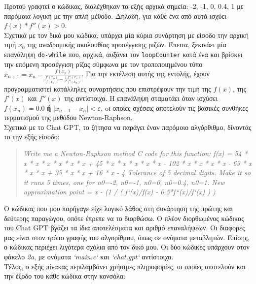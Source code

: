 \documentclass[a4paper, 14pt]{article}   %
\begin{document}
Προτού γραφτεί ο κώδικας, διαλέχθηκαν τα εξής αρχικά σημεία: -2, -1, 0, 0.4, 1 με παρόμοια λογική με την απλή μέθοδο. Δηλαδή, για κάθε ένα από αυτά ισχύει \(f(x)*f''(x)>0\).\\

Σχετικά με τον δικό μου κώδικα, υπάρχει μία κύρια συνάρτηση με είσοδο την αρχική τιμή \(x_0\) της αναδρομικής ακολουθίας προσέγγισης ριζών. Έπειτα, ξεκινάει μία επανάληψη \texttt{do-while} που, αρχικά, αυξάνει τον \texttt{loopCounter} κατά ένα και βρίσκει την επόμενη προσέγγιση ρίζας σύμφωνα με τον τροποποιημένου τύπο \(x_{n+1} = x_n - \frac{f(x_n)}{\frac{f'(x_n)}{f(x_n)} - \frac{1}{2} \frac{f''(x_n)}{f'(x_n)}}\). Για την εκτέλεση αυτής της εντολής, έχουν προγραμματιστεί κατάλληλες συναρτήσεις που επιστρέφουν την τιμή της \(f(x)\), της \(f'(x)\) και \(f''(x)\) της αντίστοιχα. Η επανάληψη σταματάει όταν ισχύσει \(f(x_{n}) = 0.0\) \textbf{ή} \(|x_{n-1} - x_n| < \varepsilon\), oι οποίες σχέσεις αποτελούν τις βασικές συνθήκες τερματισμού της μεθόδου Newton-Raphson.\\

Σχετικά με το Chat GPT, το ζήτησα να παράγει έναν παρόμοιο αλγόρθιθμο, δίνοντάς το την εξής είσοδο:
	\begin{quote}
	{\small \emph{Write me a Newton-Raphson method C code for this function: f(x) = 54 * x * x * x * x * x * x + 45 * x * x * x * x * x - 102 * x * x * x * x - 69 * x * x * x + 35 * x * x + 16 * x - 4
Tolerance of 5 decimal digits.
Make it so it runs 5 times, one for n0=-2, n0=-1, n0=0, n0=0.4, n0=1.
New approximation point = x - (1 / ( f`(x)/f(x) - 0.5*f``(x)/f`(x) ) )}}
	\end{quote}
Ο κώδικας που μου παρήγαγε είχε λογικό λάθος στη συνάρτηση της πρώτης και δεύτερης παραγώγου, οπότε έπρεπε να το διορθώσω. Ο πλέον διορθωμένος κώδικας του Chat GPT βγάζει τα ίδια αποτελέσματα και αριθμό επαναλήψεων. Οι διαφορές μας είναι στον τρόπο γραφής του αλγορίθμου, όπως σε ονόματα μεταβλητών. Επίσης, ο κώδικας περιέχει λιγότερα σχόλια από τον δικό μου. Οι δύο κώδικες υπάρχουν στον φάκελο \emph{2a}, με ονόματα \emph{`main.c`} και \emph{`chat.gpt`} αντίστοιχα.\\

Τέλος, ο εξής πίνακας περιλαμβάνει χρήσιμες πληροφορίες, οι οποίες αποτελούν και την έξοδο του κάθε κώδικα στην κονσόλα:\\
\end{document}
